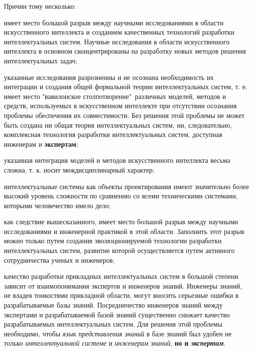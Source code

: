 \begin{SCn}
{Причин тому несколько:
\begin{scnitemize}
    \item имеет место большой разрыв между научными исследованиями в области искусственного интеллекта и созданием качественных технологий разработки интеллектуальных систем. Научные исследования в области искусственного интеллекта в основном сконцентрированы на разработку новых методов решения интеллектуальных задач;
    \item указанные исследования разрозненны и не осознана необходимость их интеграции и создания общей формальной теории интеллектуальных систем, т. е. имеет место "вавилонское столпотворение"\ различных моделей, методов и средств, используемых в искусственном интеллекте при отсутствии осознания проблемы обеспечения их совместимости. Без решения этой проблемы не может быть создана ни общая теория интеллектуальных систем, ни, следовательно, комплексная технология разработки интеллектуальных систем, доступная инженерам и \textbf{экспертам};
    \item указанная интеграция моделей и методов искусственного интеллекта весьма сложна, т. к. носит междисциплинарный характер;
    \item интеллектуальные системы как объекты проектирования имеют значительно более высокий уровень сложности по сравнению со всеми техническими системами, которыми человечество имело дело;
    \item как следствие вышесказанного, имеет место большой разрыв между научными исследованиями и инженерной практикой в этой области. Заполнить этот разрыв можно только путем создания эволюционируемой технологии разработки интеллектуальных систем, развитие которой осуществляется путем активного сотрудничества ученых и инженеров;
    \item качество разработки прикладных интеллектуальных систем в большой степени зависит от взаимопонимания экспертов и инженеров знаний. Инженеры знаний, не владея тонкостями прикладной области, могут вносить серьезные ошибки в разрабатываемые базы знаний. Посредничество инженеров знаний между экспертами и разрабатываемой базой знаний существенно снижает качество разрабатываемых интеллектуальных систем. Для решения этой проблемы необходимо, чтобы \textit{язык представления знаний} в базе знаний был удобен не только \textit{интеллектуальной системе} и \textit{инженерам знаний}, \textbf{но и \textit{экспертам}}.
    
\end{scnitemize}

}
\end{SCn}
